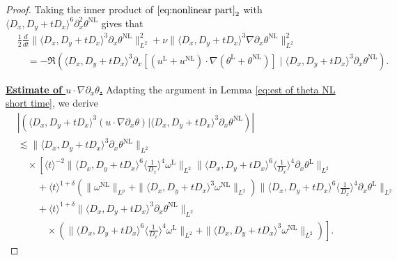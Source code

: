 \documentclass[reqno, 12pt]{amsart} %
\theoremstyle{plain} %
\theoremstyle{definition}
\theoremstyle{remark}
\numberwithin{equation}{section} %
\newcommand{\lt}{\left}
\newcommand{\rt}{\right}
\newcommand{\px}{\partial_x}
\begin{document}
	\begin{proof}
		Taking the inner product of $\eqref{eq:nonlinear part}_2$ with $\langle D_x, D_y+t D_x\rangle^6 \px^2 \theta^{\mathrm{NL}}$ gives that
		\begin{equation}\begin{aligned} \label{eq:1}
				&  \frac12 \frac{d}{ d t}\|\langle D_x, D_y+t D_x\rangle^3 \px \theta^{\mathrm{NL}}\|_{L^2}^2+\nu\|\langle D_x, D_y+t D_x\rangle^3 \nabla \px \theta^{\mathrm{NL}}\|_{L^2}^2 \\
				& \quad=-\Re\left(\langle D_x, D_y+t D_x\rangle^3 \px \left[\left(u^{\mathrm{L}}+u^{\mathrm{NL}}\right) \cdot \nabla\left(\theta^{\mathrm{L}}  +  \theta^{\mathrm{NL}}\right)\right] \mid\langle D_x, D_y+t D_x\rangle^3 \px \theta^{\mathrm{NL}}\right) .
		\end{aligned}\end{equation}
		
		
		\underline{\bf Estimate of $u \cdot \nabla \px \theta$.} Adapting the argument in Lemma \ref{eq:est of theta NL short time}, we derive
		\begin{equation}
			\begin{aligned} \label{eq:2}
				& \left|\left(\langle D_x, D_y+t D_x\rangle^3(u \cdot \nabla \px\theta )  \big| \langle D_x, D_y+t D_x\rangle^3 \px\theta^{\mathrm{NL}}\right)\right| \\
				&\lesssim\|\langle D_x, D_y+t D_x\rangle^3 \px \theta^{\mathrm{NL}}\|_{L^2} \\
				&\quad \times  \left[\langle t\rangle^{-2} \|\langle D_x, D_y+t D_x\rangle^6\langle\frac{1}{D_x}\rangle^4 \omega^{\mathrm{L}}\|_{L^2}
				\|\langle D_x, D_y+t D_x\rangle^6\langle\frac{1}{D_x}\rangle^4 \px \theta^{\mathrm{L}}\|_{L^2} \rt.\\
				&\lt.\quad \quad +\langle t\rangle^{1+\delta}  \left(\|\omega^{\mathrm{NL}}\|_{L^p}+\|\langle D_x, D_y+t D_x\rangle^3 \omega^{\mathrm{NL}}\|_{L^2}\right) 
				\|\langle D_x, D_y+t D_x\rangle^6\langle\frac{1}{D_x}\rangle^4 \px  \theta^{\mathrm{L}}\|_{L^2} \rt.  \\
				& \left.\quad \quad  + \langle t\rangle^{1+\delta}\|\langle D_x, D_y+t D_x\rangle^3 \px \theta^{\mathrm{NL}}\|_{L^2} \rt. \\
				&\lt.   \qquad \quad \times \left(\|\langle D_x, D_y+t D_x\rangle^6\langle\frac{1}{D_x}\rangle^4 \omega^{\mathrm{L}}\|_{L^2}  + \|\langle D_x, D_y+t D_x\rangle^3 \omega^{\mathrm{NL}}\|_{L^2} \right) \right].
			\end{aligned}
		\end{equation}
		

\end{proof}
\end{document}

